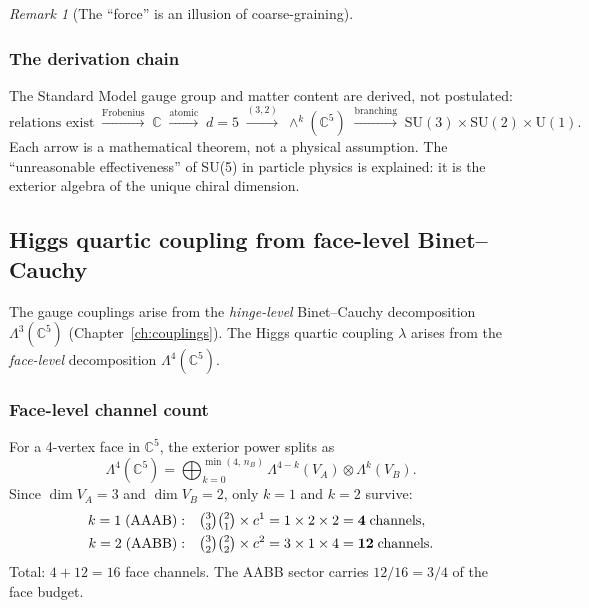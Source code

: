 \documentclass[12pt]{article}
\theoremstyle{remark}
\newtheorem{remark}[theorem]{Remark}
\theoremstyle{definition}
\newcommand{\CC}{\mathbb{C}}
\begin{document}
\begin{remark}[The ``force'' is an illusion of coarse-graining]
\subsubsection{The derivation chain}

The Standard Model gauge group and matter content are derived, not postulated:
\begin{equation}
\text{relations exist} \;\xrightarrow{\text{Frobenius}}\; \CC \;\xrightarrow{\text{atomic}}\; d = 5 \;\xrightarrow{(3,2)}\; \wedge^k(\CC^5) \;\xrightarrow{\text{branching}}\; \text{SU}(3) \times \text{SU}(2) \times \text{U}(1).
\end{equation}
Each arrow is a mathematical theorem, not a physical assumption.  The ``unreasonable effectiveness'' of SU(5) in particle physics is explained: it is the exterior algebra of the unique chiral dimension.

\subsection{Higgs quartic coupling from face-level Binet--Cauchy}
\label{sec:higgs_quartic}

The gauge couplings arise from the \emph{hinge-level} Binet--Cauchy decomposition $\Lambda^3(\CC^5)$ (Chapter~\ref{ch:couplings}).  The Higgs quartic coupling $\lambda$ arises from the \emph{face-level} decomposition $\Lambda^4(\CC^5)$.

\subsubsection{Face-level channel count}

For a 4-vertex face in $\CC^5$, the exterior power splits as
\begin{equation}
\Lambda^4(\CC^5) = \bigoplus_{k=0}^{\min(4,\,n_B)} \Lambda^{4-k}(V_A) \otimes \Lambda^k(V_B).
\end{equation}
Since $\dim V_A = 3$ and $\dim V_B = 2$, only $k = 1$ and $k = 2$ survive:
\begin{align}
k = 1\;(\text{AAAB}):&\quad \tbinom{3}{3}\tbinom{2}{1}\times c^1 = 1 \times 2 \times 2 = \mathbf{4}\;\text{channels}, \\
k = 2\;(\text{AABB}):&\quad \tbinom{3}{2}\tbinom{2}{2}\times c^2 = 3 \times 1 \times 4 = \mathbf{12}\;\text{channels}.
\end{align}
Total: $4 + 12 = 16$ face channels.  The AABB sector carries $12/16 = 3/4$ of the face budget.


\end{remark}
\end{document}
